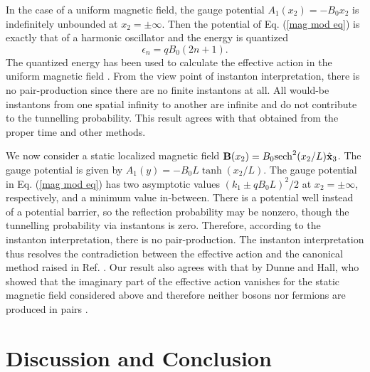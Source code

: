 \documentclass[a4paper,prd,showpacs,preprintnumbers,amsmath,amssymb]{revtex4}
\begin{document}
In the case of a uniform magnetic field, the gauge potential $A_1
(x_2) = - B_0 x_2$ is indefinitely unbounded at $x_2 = \pm
\infty$. Then the potential of Eq. (\ref{mag mod eq}) is exactly
that of a harmonic oscillator and the energy is quantized
\begin{equation}
\epsilon_n = q B_0 (2n+1).
\end{equation}
The quantized energy has been used to calculate the effective
action in the uniform magnetic field \cite{hei}. From the view
point of instanton interpretation, there is no pair-production
since there are no finite instantons at all. All would-be
instantons from one spatial infinity to another are infinite and
do not contribute to the tunnelling probability. This result
agrees with that obtained from the proper time and other methods.



We now consider a static localized magnetic field ${\bf B} (x_2) =
B_0 {\rm sech}^2 (x_2/L ) \hat{\bf x}_3$. The gauge potential is
given by $A_1 (y) = - B_0 L \tanh (x_2/L)$. The gauge potential in
Eq. (\ref{mag mod eq}) has two asymptotic values $(k_1 \pm q B_0
L)^2/2$ at $x_2 = \pm \infty$, respectively, and a minimum value
in-between. There is a potential well instead of a potential
barrier, so the reflection probability may be nonzero, though the
tunnelling probability via instantons is zero. Therefore,
according to the instanton interpretation, there is no
pair-production. The instanton interpretation thus resolves the
contradiction between the effective action and the canonical
method raised in Ref. \cite{sri}. Our result also agrees with that
by Dunne and Hall, who showed that the imaginary part of the
effective action vanishes for the static magnetic field considered
above and therefore neither bosons nor fermions are produced in
pairs \cite{dun2,dun3}.









\section{Discussion and Conclusion}
\end{document}
